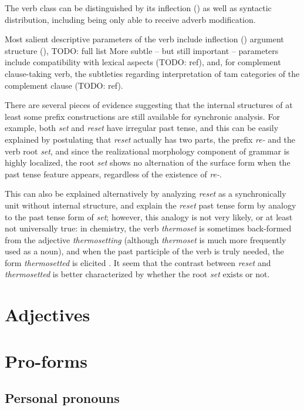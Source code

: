 \documentclass[UTF8, a4paper, oneside, scheme=plain, 12pt]{ctexbook}
\newcommand{\form}[1]{\emph{#1}}
\begin{document}
The verb class can be distinguished by its inflection ()
as well as syntactic distribution,
including being only able to receive adverb modification. 

Most salient descriptive parameters of the verb include
inflection ()
argument structure (),
TODO: full list
More subtle -- but still important -- parameters 
include compatibility with lexical aspects (TODO: ref), 
and, for complement clause-taking verb,
the subtleties regarding interpretation of \ac{tam} categories 
of the complement clause (TODO: ref).

There are several pieces of evidence suggesting that 
the internal structures of at least some prefix constructions 
are still available for synchronic analysis.
For example, both \form{set} and \form{reset} have irregular past tense, 
and this can be easily explained by postulating that 
\form{reset} actually has two parts, 
the prefix \form{re-} and the verb root \form{set},
and since the realizational morphology component of grammar is highly localized, 
the root \form{set} shows no alternation of the surface form 
when the past tense feature appears,
regardless of the existence of \form{re-}. 

This can also be explained alternatively by analyzing \form{reset} 
as a synchronically unit without internal structure, 
and explain the \form{reset} past tense form 
by analogy to the past tense form of \form{set};
however, this analogy is not very likely,  
or at least not universally true:
in chemistry,
the verb \form{thermoset} is sometimes back-formed from the adjective \form{thermosetting} 
(although \form{thermoset} is much more frequently used as a noun),
and when the past participle of the verb is truly needed, 
the form \form{thermosetted} is elicited 
\citep{d2021chemical}.
It seem that the contrast between \form{reset} and \form{thermosetted} 
is better characterized by whether the root \form{set} exists or not. 

\section{Adjectives}


\section{Pro-forms}

\subsection{Personal pronouns}
\end{document}
